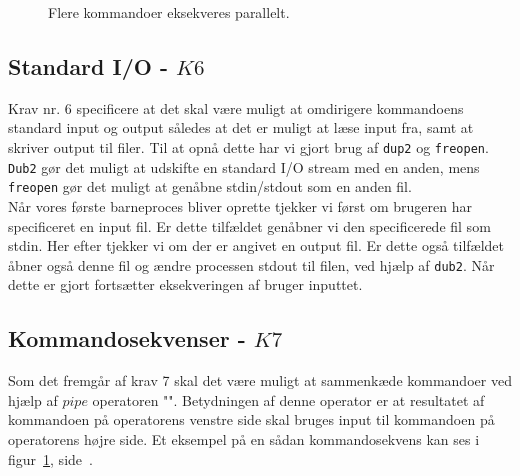 \documentclass[final]{article}
\begin{document}
\begin{figure}[H]
\center
{}
\caption{Flere kommandoer eksekveres parallelt.}
\label{fig:background}
\end{figure}

\subsection{Standard I/O - $K6$}
Krav nr. 6 specificere at det skal være muligt at omdirigere kommandoens standard input og output således at det er muligt at læse input fra, samt at skriver output til filer. Til at opnå dette har vi gjort brug af \texttt{dup2} og \texttt{freopen}. \texttt{Dub2} gør det muligt at udskifte en standard I/O stream med en anden, mens \texttt{freopen} gør det muligt at genåbne stdin/stdout som en anden fil.\\
Når vores første barneproces bliver oprette tjekker vi først om brugeren har specificeret en input fil. Er dette tilfældet genåbner vi den specificerede fil som stdin. Her efter tjekker vi om der er angivet en output fil. Er dette også tilfældet åbner også denne fil og ændre processen stdout til filen, ved hjælp af \texttt{dub2}. Når dette er gjort fortsætter eksekveringen af bruger inputtet. 

\subsection{Kommandosekvenser - $K7$}
Som det fremgår af krav 7 skal det være muligt at sammenkæde kommandoer ved hjælp af $pipe$ operatoren "\textbar". Betydningen af denne operator er at resultatet af kommandoen på operatorens venstre side skal bruges input til kommandoen på operatorens højre side. Et eksempel på en sådan kommandosekvens kan ses i figur~\ref{fig:background}, side~\pageref{fig:background}.\\
\end{document}
